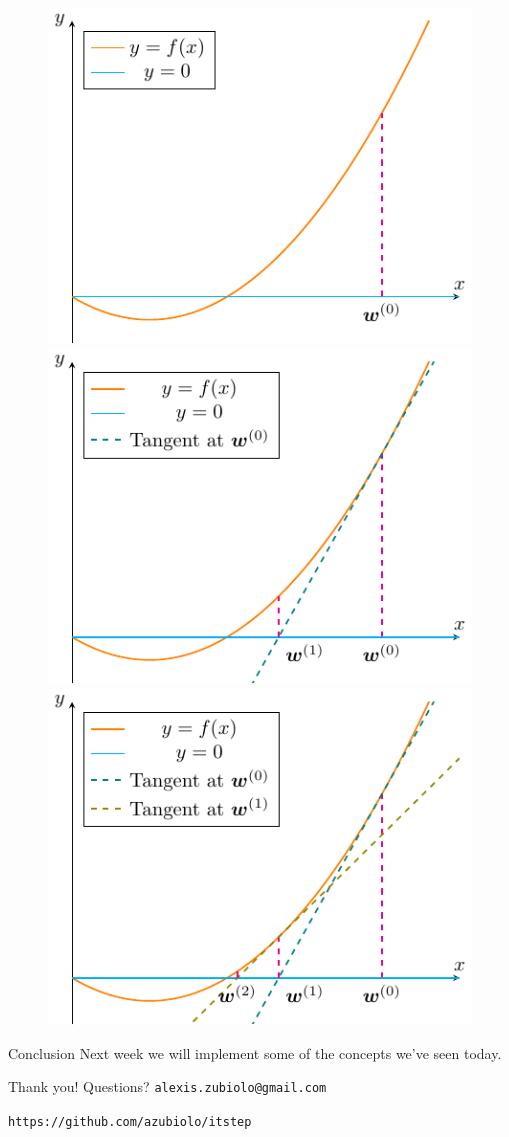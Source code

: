 \documentclass{beamer}
\newcommand{\1}[1]{\mathbbm{1}\left[#1\right]}
\begin{document}
\begin{frame}
\begin{figure}[htb]
        \includegraphics[width=.3\linewidth]{images/newton_method0}\hfill
         \includegraphics[width=.3\linewidth]{images/newton_method1}\hfill
        \includegraphics[width=.3\linewidth]{images/newton_method2}
\end{figure}
\end{frame}

\begin{frame}{Conclusion}
Next week we will implement some of the concepts we've seen today.
\end{frame}

\begin{frame}
\vfill
\centering
\begin{huge}
\huge{Thank you! Questions?}
\vfill
\texttt{alexis.zubiolo@gmail.com}
\end{huge}
\vfill
\begin{Large}
\texttt{https://github.com/azubiolo/itstep}
\end{Large}
\vfill
\end{frame}
\end{document}
